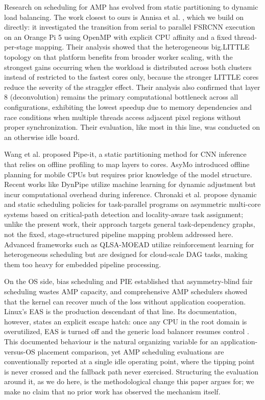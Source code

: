 \documentclass[conference]{IEEEtran}
\begin{document}
Research on scheduling for AMP has evolved from static partitioning to dynamic load balancing. The work closest to ours is Annisa et al. \cite{annisa2025fsrcnn}, which we build on directly: it investigated the transition from serial to parallel FSRCNN execution on an Orange Pi 5 using OpenMP with explicit CPU affinity and a fixed thread-per-stage mapping. Their analysis showed that the heterogeneous big.LITTLE topology on that platform benefits from broader worker scaling, with the strongest gains occurring when the workload is distributed across both clusters instead of restricted to the fastest cores only, because the stronger LITTLE cores reduce the severity of the straggler effect. Their analysis also confirmed that layer 8 (deconvolution) remains the primary computational bottleneck across all configurations, exhibiting the lowest speedup due to memory dependencies and race conditions when multiple threads access adjacent pixel regions without proper synchronization. Their evaluation, like most in this line, was conducted on an otherwise idle board.

Wang et al. \cite{wang2020pipeit} proposed Pipe-it, a static partitioning method for CNN inference that relies on offline profiling to map layers to cores. AsyMo \cite{wang2021asymo} introduced offline planning for mobile CPUs but requires prior knowledge of the model structure. Recent works like DynPipe \cite{yuan2025dynpipe} utilize machine learning for dynamic adjustment but incur computational overhead during inference. Chronaki et al. \cite{chronaki2017task} propose dynamic and static scheduling policies for task-parallel programs on asymmetric multi-core systems based on critical-path detection and locality-aware task assignment; unlike the present work, their approach targets general task-dependency graphs, not the fixed, stage-structured pipeline mapping problem addressed here. Advanced frameworks such as QLSA-MOEAD \cite{saad2026qlsa} utilize reinforcement learning for heterogeneous scheduling but are designed for cloud-scale DAG tasks, making them too heavy for embedded pipeline processing.

On the OS side, bias scheduling \cite{koufaty2010bias} and PIE \cite{vancraeynest2012pie} established that asymmetry-blind fair scheduling wastes AMP capacity, and comprehensive AMP schedulers \cite{saez2010comprehensive} showed that the kernel can recover much of the loss without application cooperation. Linux's EAS is the production descendant of that line. Its documentation, however, states an explicit escape hatch: once any CPU in the root domain is overutilized, EAS is turned off and the generic load balancer resumes control \cite{linuxeas}. This documented behaviour is the natural organizing variable for an application-versus-OS placement comparison, yet AMP scheduling evaluations are conventionally reported at a single idle operating point, where the tipping point is never crossed and the fallback path never exercised. Structuring the evaluation around it, as we do here, is the methodological change this paper argues for; we make no claim that no prior work has observed the mechanism itself.
\end{document}
